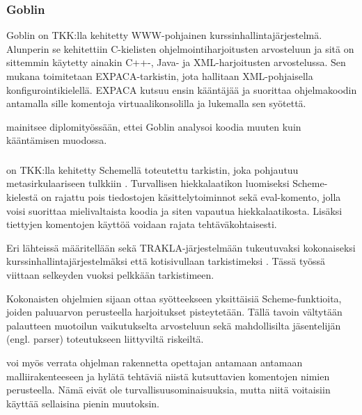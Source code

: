 \subsubsection{Goblin}

Goblin on TKK:lla kehitetty WWW-pohjainen kurssinhallintajärjestelmä.
Alunperin se kehitettiin C-kielisten ohjelmointiharjoitusten arvosteluun
ja sitä on sittemmin käytetty ainakin C++-, Java- ja XML-harjoitusten
arvostelussa. Sen mukana toimitetaan EXPACA-tarkistin, jota hallitaan
XML-pohjaisella konfigurointikielellä. EXPACA kutsuu ensin kääntäjää ja
suorittaa ohjelmakoodin antamalla sille komentoja virtuaalikonsolilla ja
lukemalla sen syötettä. \citep{Hiisila2005}

\citet{Hiisila2005} mainitsee diplomityössään, ettei Goblin analysoi koodia muuten
kuin kääntämisen muodossa.

\subsubsection{\scmrobo}

{\scmrobo} on TKK:lla kehitetty Schemellä toteutettu tarkistin, joka pohjautuu
metasirkulaariseen tulkkiin \citep{sicp}. Turvallisen hiekkalaatikon luomiseksi
Scheme-kielestä on rajattu pois tiedostojen käsittelytoiminnot
\citep{saikkonen2001fully} sekä eval-komento, jolla
voisi suorittaa mielivaltaista koodia ja siten vapautua hiekkalaatikosta.
Lisäksi tiettyjen komentojen käyttöä voidaan rajata tehtäväkohtaisesti.
\citep{liljasaikkonen}

Eri lähteissä {\scmrobo} määritellään sekä TRAKLA-järjestelmään \citep{trakla}
tukeutuvaksi kokonaiseksi kurssinhallintajärjestelmäksi
\citep{saikkonen2001fully} että kotisivullaan tarkistimeksi
\citep{liljasaikkonen}. Tässä työssä viittaan selkeyden vuoksi pelkkään
tarkistimeen.

Kokonaisten ohjelmien sijaan {\scmrobo} ottaa syötteekseen yksittäisiä
Scheme-funktioita, joiden paluuarvon perusteella harjoitukset pisteytetään.
Tällä tavoin vältytään palautteen muotoilun vaikutukselta arvosteluun sekä
mahdollisilta jäsentelijän (engl. parser) toteutukseen liittyviltä riskeiltä.
\citep{saikkonen2001fully}

{\scmrobo} voi myös verrata ohjelman rakennetta opettajan antamaan
antamaan malliirakenteeseen ja hylätä tehtäviä niistä kutsuttavien komentojen
nimien perusteella. \citep{saikkonen2001fully} Nämä eivät ole
turvallisuusominaisuuksia, mutta niitä voitaisiin käyttää sellaisina pienin
muutoksin.

